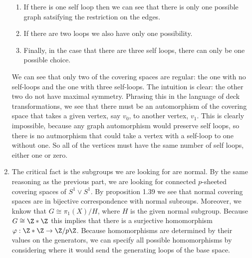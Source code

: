\documentclass{article}
\begin{document}
\begin{solution}{0cm}
\begin{enumerate}
\begin{enumerate}
    \item If there is one self loop then we can see that there is only
      one possible graph satsifying the restriction on the edges.
    \item If there are two loops we also have only one possibility.
    \item Finally, in the case that there are three self loops, there
      can only be one possible choice.
    \end{enumerate}
    We can see that only two of the covering spaces are regular: the
    one with no self-loops and the one with three self-loops. The
    intuition is clear: the other two do not have maximal
    symmetry. Phrasing this in the language of deck transformations,
    we see that there must be an automorphism of the covering space
    that takes a given vertex, say $v_0$, to another vertex,
    $v_1$. This is clearly impossible, because any graph automorphism
    would preserve self loops, so there is no autmorphism that could
    take a vertex with a self-loop to one without one. So all of the
    vertices must have the same number of self loops, either one or
    zero. 
  \item The critical fact is the subgroups we are looking for are
    normal. By the same reasoning as the previous part, we are looking
    for connected $p$-sheeted covering spaces of $S^1 \vee S^1$. By
    proposition 1.39 we see that normal covering spaces are in
    bijective correspondence with normal subroups. Moreover, we knkow
    that $G \cong \pi_1(X)/H$, where $H$ is the given normal
    subgroup. Because $G \cong \Z \ast \Z$ this implies that there is
    a surjective homomorphism $\varphi: \Z \ast \Z \to
    \Z/p\Z$. Because homomorphisms are determined by their values on
    the generators, we can specify all possible homomorphisms by
    considering where it would send the generating loops of the base
    space.


\end{enumerate}
\end{solution}
\end{document}
